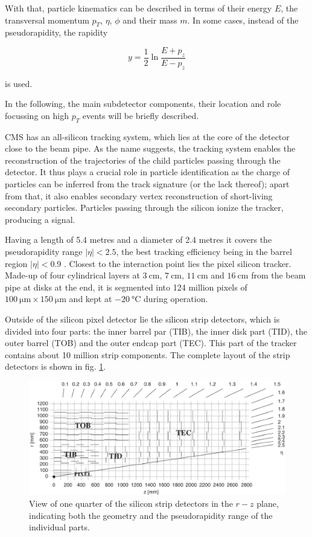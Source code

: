 With that, particle kinematics can be described in terms of their energy $E$, the transversal momentum $p_T$, $\eta$, $\phi$ and their mass $m$. In some cases, instead of the pseudorapidity, the rapidity

\begin{equation*}
	y = \frac{1}{2}\ln\frac{E+p_z}{E-p_z}
\end{equation*}

is used.

In the following, the main subdetector components, their location and role focussing on high $p_T$ events will be briefly described.


CMS has an all-silicon tracking system, which lies at the core of the detector close to the beam pipe. As the name suggests, the tracking system enables the reconstruction of the trajectories of the child particles passing through the detector. It thus plays a crucial role in particle identification as the charge of particles can be inferred from the track signature (or the lack thereof); apart from that, it also enables secondary vertex reconstruction of short-living secondary particles. Particles passing through the silicon ionize the tracker, producing a signal.

Having a length of 5.4 metres and a diameter of 2.4 metres it covers the pseudorapidity range $|\eta|<2.5$, the best tracking efficiency being in the barrel region $|\eta| < 0.9$ \cite{Veszpremi_2014}. Closest to the interaction point lies the pixel silicon tracker. Made-up of four cylindrical layers at $\SI{3}{\centi\meter}$, $\SI{7}{\centi\meter}$, $\SI{11}{\centi\meter}$ and $\SI{16}{\centi\meter}$ from the beam pipe at disks at the end, it is segmented into 124 million pixels of $\SI{100}{\micro\meter} \times \SI{150}{\micro\meter}$ and kept at $\SI{-20}{\degreeCelsius}$ during operation.

Outside of the silicon pixel detector lie the silicon strip detectors, which is divided into four parts: the inner barrel par (TIB), the inner disk part (TID), the outer barrel (TOB) and the outer endcap part (TEC). This part of the tracker contains about 10 million strip components. The complete layout of the strip detectors is shown in fig. \ref{fig:strip_tracker}.

\begin{figure}[h!]
	\centering
	\includegraphics[width=0.8\linewidth]{figures/experiment/StripTracker}
	\caption{View of one quarter of the silicon strip detectors in the $r-z$ plane, indicating both the geometry and the pseudorapidity range of the individual parts. \cite{Azzurri:914891}}
	\label{fig:strip_tracker}
\end{figure}

